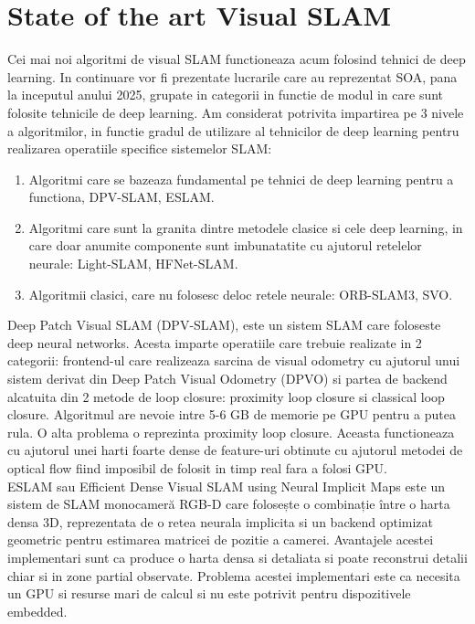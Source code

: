 \documentclass[12pt,a4paper]{report}
\begin{document}
\section{State of the art Visual SLAM}
Cei mai noi algoritmi de visual SLAM functioneaza acum folosind tehnici
de deep learning. In continuare vor fi prezentate lucrarile care au reprezentat SOA, pana la inceputul 
anului 2025, grupate in categorii in functie de modul in care sunt folosite tehnicile de deep learning.
Am considerat potrivita impartirea pe 3 nivele a algoritmilor, in functie gradul de utilizare 
al tehnicilor de deep learning pentru realizarea operatiile specifice sistemelor SLAM:\@
\begin{enumerate}
    \item Algoritmi care se bazeaza fundamental pe tehnici de deep learning pentru a functiona, 
DPV-SLAM, ESLAM.\@
    \item Algoritmi care sunt la granita dintre metodele clasice si cele deep learning, in care 
doar anumite componente sunt imbunatatite cu ajutorul retelelor neurale: Light-SLAM, HFNet-SLAM.\@
    \item Algoritmii clasici, care nu folosesc deloc retele neurale: ORB-SLAM3, SVO.\@ 
\end{enumerate}   
Deep Patch Visual SLAM (DPV-SLAM), este un sistem SLAM care foloseste deep neural networks.
Acesta imparte operatiile care trebuie realizate in 2 categorii: frontend-ul care realizeaza 
sarcina de visual odometry cu ajutorul unui sistem derivat din Deep Patch Visual Odometry (DPVO)
si partea de backend alcatuita din 2 metode de loop closure: proximity loop closure si classical
loop closure. Algoritmul are nevoie intre 5{-}6 GB de memorie pe GPU pentru a putea rula. 
O alta problema o reprezinta proximity loop closure. Aceasta functioneaza cu ajutorul unei harti
foarte dense de feature-uri obtinute cu ajutorul metodei de optical flow fiind imposibil de folosit 
in timp real fara a folosi GPU.\@ \\

ESLAM sau Efficient Dense Visual SLAM using Neural Implicit Maps este un sistem de SLAM 
monocameră RGB-D care folosește o combinație între o harta densa 3D, reprezentata de o retea 
neurala implicita si un backend optimizat geometric pentru estimarea matricei de pozitie a camerei.
Avantajele acestei implementari sunt ca produce o harta densa si detaliata si poate reconstrui 
detalii chiar si in zone partial observate. Problema acestei implementari este ca necesita un 
GPU si resurse mari de calcul si nu este potrivit pentru dispozitivele embedded. \\
\end{document}
